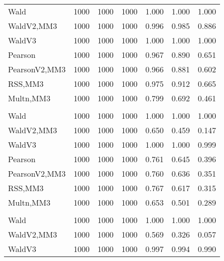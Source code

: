 \documentclass[
]{article}
\begin{document}
\begin{table}[H]
{\begin{tabular}[t]{lrrrrrr}
\hspace{1em}Wald & 1000 & 1000 & 1000 & 1.000 & 1.000 & \vphantom{2} 1.000\\
\hspace{1em}WaldV2,MM3 & 1000 & 1000 & 1000 & 0.996 & 0.985 & 0.886\\
\hspace{1em}WaldV3 & 1000 & 1000 & 1000 & 1.000 & 1.000 & 1.000\\
\hspace{1em}Pearson & 1000 & 1000 & 1000 & 0.967 & 0.890 & 0.651\\
\hspace{1em}PearsonV2,MM3 & 1000 & 1000 & 1000 & 0.966 & 0.881 & 0.602\\
\hspace{1em}RSS,MM3 & 1000 & 1000 & 1000 & 0.975 & 0.912 & 0.665\\
\hspace{1em}Multn,MM3 & 1000 & 1000 & 1000 & 0.799 & 0.692 & 0.461\\
\addlinespace[0.3em]
\multicolumn{7}{l}{\textbf{2F 10V}}\\
\hspace{1em}Wald & 1000 & 1000 & 1000 & 1.000 & 1.000 & \vphantom{1} 1.000\\
\hspace{1em}WaldV2,MM3 & 1000 & 1000 & 1000 & 0.650 & 0.459 & 0.147\\
\hspace{1em}WaldV3 & 1000 & 1000 & 1000 & 1.000 & 1.000 & 0.999\\
\hspace{1em}Pearson & 1000 & 1000 & 1000 & 0.761 & 0.645 & 0.396\\
\hspace{1em}PearsonV2,MM3 & 1000 & 1000 & 1000 & 0.760 & 0.636 & 0.351\\
\hspace{1em}RSS,MM3 & 1000 & 1000 & 1000 & 0.767 & 0.617 & 0.315\\
\hspace{1em}Multn,MM3 & 1000 & 1000 & 1000 & 0.653 & 0.501 & 0.289\\
\addlinespace[0.3em]
\multicolumn{7}{l}{\textbf{3F 15V}}\\
\hspace{1em}Wald & 1000 & 1000 & 1000 & 1.000 & 1.000 & 1.000\\
\hspace{1em}WaldV2,MM3 & 1000 & 1000 & 1000 & 0.569 & 0.326 & 0.057\\
\hspace{1em}WaldV3 & 1000 & 1000 & 1000 & 0.997 & 0.994 & 0.990\\

\end{tabular}}
\end{table}
\end{document}
